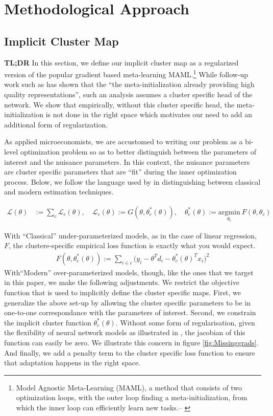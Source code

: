 \documentclass[a4paper,12pt]{article}
\begin{document}
\section{Methodological Approach}
\subsection{Implicit Cluster Map}
\textbf{TL;DR} In this section, we define our implicit cluster map as a regularized version of the popular gradient based meta-learning MAML.\footnote{Model Agnostic Meta-Learning (MAML), a method that consists of two optimization loops, with the outer loop finding a meta-initialization,
from which the inner loop can efficiently learn new tasks.-- \cite{raghu2019rapid}} While follow-up work such as \cite{raghu2019rapid} has shown that the ``the meta-initialization already providing high quality
representations'', such an analysis assumes a cluster specific head of the network. We show that empirically, without this cluster specific head, the meta-initialization is not done in the right space which motivates our need to add an additional form of regularization.

As applied microeconomists, we are accustomed to writing our problem as a bi-level optimization problem so as to better distinguish between the parameters of interest and the nuisance parameters. In this context, the nuisance parameters are cluster specific parameters that are ``fit'' during the inner optimization process. Below, we follow the language used by \cite{belkin2021fit} in distinguishing between classical and modern estimation techniques.
 
\begin{align*}
    \mathcal{L}(\theta) &:= \sum _c \mathcal{L}_c(\theta), \quad \mathcal{L}_c(\theta) := G(\theta, \theta^*_c(\theta)), \quad  \theta_c^*(\theta) := \underset{\theta_c}{\textrm{argmin}} \ F(\theta, \theta_c) 
\end{align*}

With “Classical” under-parameterized models, as in the case of linear regression, $F$, the clustere-specific empirical loss function is exactly what you would expect. 
\begin{align*}
    F(\theta, \theta_c^*(\theta)) := \sum _{i \in c}\big(y_i - \theta^Td_i - \theta _c^*(\theta)^Tx_i \big)^2
\end{align*}
 With“Modern” over-parameterized models, though, like the ones that we target in this paper, we make the following adjustments. 
 We restrict the objective function that is used to implicitly define the cluster specific maps. First, we generalize the above set-up by allowing the cluster specific parameters to be in one-to-one correspondance with the parameters of interest. Second, we constrain the implicit cluster function $\theta_c^*(\theta)$. Without some form of regularisation, given the flexibility of neural network models as illustrated in \cite{zhang2021understanding}, the jacobian of this function can easily be zero. We illustrate this concern in figure \ref{fig:Missinggrads}. And finally, we add a penalty term to the cluster specific loss function to ensure that adaptation happens in the right space. 
 
\end{document}
